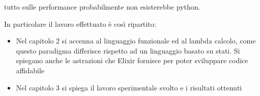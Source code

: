 tutto sulle performance probabilmente non esisterebbe python.


In particolare il lavoro effettuato è così ripartito: 

\begin{itemize}
	\item Nel capitolo 2 si accenna al linguaggio funzionale ed al
	lambda calcolo, come questo paradigma differisce
	rispetto ad un linguaggio basato su stati. Si spiegano anche
	le astrazioni che Elixir fornisce per poter	sviluppare codice affidabile
	\item Nel capitolo 3 si spiega il lavoro sperimentale svolto e i risultati
	ottenuti

\end{itemize}



